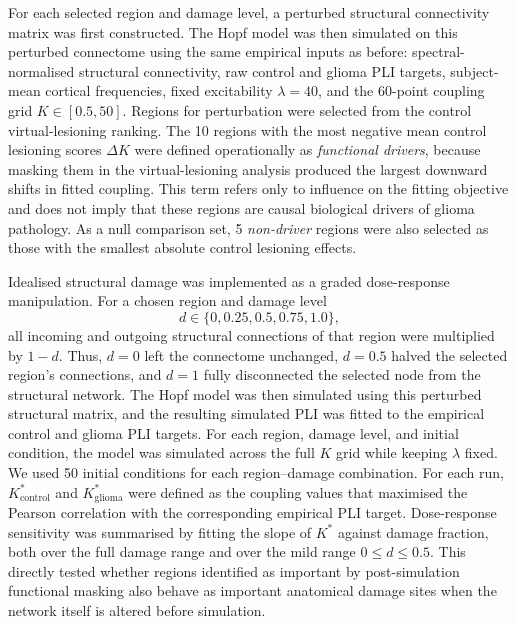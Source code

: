 \documentclass[11pt, reprint, aps, prl, floatfix, secnumarabic]{revtex4-2}
\begin{document}
For each selected region and damage level, a perturbed structural connectivity matrix was first constructed. The Hopf model was then simulated on this perturbed connectome using the same empirical inputs as before: spectral-normalised structural connectivity, raw control and glioma PLI targets, subject-mean cortical frequencies, fixed excitability \(\lambda = 40\), and the 60-point coupling grid \(K \in [0.5,50]\).
Regions for perturbation were selected from the control virtual-lesioning ranking. The 10 regions with the most negative mean control lesioning scores $\Delta K$ were defined operationally as \emph{functional drivers}, because masking them in the virtual-lesioning analysis produced the largest downward shifts in fitted coupling. This term refers only to influence on the fitting objective and does not imply that these regions are causal biological drivers of glioma pathology. As a null comparison set, 5 \emph{non-driver} regions were also selected as those with the smallest absolute control lesioning effects. 

Idealised structural damage was implemented as a graded dose-response manipulation. For a chosen region and damage level
\[
d \in \{0, 0.25, 0.5, 0.75, 1.0\},
\]
all incoming and outgoing structural connections of that region were multiplied by \(1-d\). Thus, \(d=0\) left the connectome unchanged, \(d=0.5\) halved the selected region's connections, and \(d=1\) fully disconnected the selected node from the structural network. The Hopf model was then simulated using this perturbed structural matrix, and the resulting simulated PLI was fitted to the empirical control and glioma PLI targets. 
For each region, damage level, and initial condition, the model was simulated across the full \(K\) grid while keeping \(\lambda\) fixed. We used 50 initial conditions for each region--damage combination. For each run, \(K^*_{\mathrm{control}}\) and \(K^*_{\mathrm{glioma}}\) were defined as the coupling values that maximised the Pearson correlation with the corresponding empirical PLI target. Dose-response sensitivity was summarised by fitting the slope of \(K^*\) against damage fraction, both over the full damage range and over the mild range \(0 \leq d \leq 0.5\).
This directly tested whether regions identified as important by post-simulation functional masking also behave as important anatomical damage sites when the network itself is altered before simulation.
\end{document}
